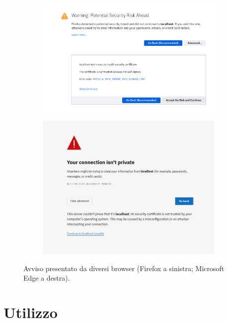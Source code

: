 \documentclass[conference,onecolumn,a4paper]{IEEEtran}
\begin{document}
\begin{figure}[H]
    \centering
    \begin{subfigure}[b]{0.4\linewidth}
        \includegraphics[width=\linewidth]{resources/firefox-warning.png}
    \end{subfigure}
    \begin{subfigure}[b]{0.3\linewidth}
        \includegraphics[width=\linewidth]{resources/edge-warning.png}
    \end{subfigure}
    \caption{Avviso presentato da diversi browser (Firefox a sinistra; Microsoft Edge a destra).}
\end{figure}

\section{Utilizzo}
\end{document}
